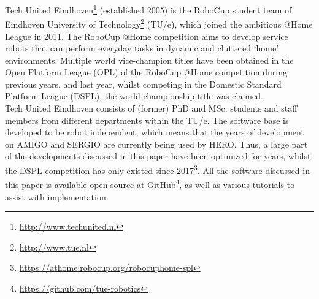 Tech United Eindhoven\footnote{\url{http://www.techunited.nl}} (established 2005) is the RoboCup student team of Eindhoven University of Technology\footnote{\url{http://www.tue.nl}} (TU/e), which joined the ambitious @Home League in 2011. The RoboCup @Home competition aims to develop service robots that can perform everyday tasks in dynamic and cluttered `home' environments.
Multiple world vice-champion titles have been obtained in the Open Platform League (OPL) of the RoboCup @Home competition during previous years, and last year, whilst competing in the Domestic Standard Platform League (DSPL), the world championship title was claimed. \\

\noindent Tech United Eindhoven consists of (former) PhD and MSc. students and staff members from different departments within the TU/e. The software base is developed to be robot independent, which means that the years of development on AMIGO and SERGIO are currently being used by HERO. Thus, a large part of the developments discussed in this paper have been optimized for years, whilst the DSPL competition has only existed since 2017\footnote{\url{https://athome.robocup.org/robocuphome-spl}}. All the software discussed in this paper is available open-source at GitHub\footnote{\url{https://github.com/tue-robotics}}, as well as various tutorials to assist with implementation. 


